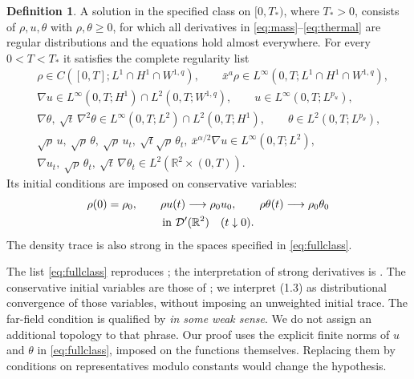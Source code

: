 \documentclass[11pt,letterpaper]{article}
\numberwithin{equation}{section}
\theoremstyle{definition}
\newtheorem{definition}[theorem]{Definition}
\newcommand{\R}{\mathbb R}
\begin{document}
\begin{definition}\label{def:solution}
A solution in the specified class on $[0,T_*)$, where $T_*>0$, consists
of $\rho,u,\theta$ with $\rho,\theta\ge0$, for which all derivatives
in \eqref{eq:mass}--\eqref{eq:thermal} are regular distributions and
the equations hold almost everywhere. For every $0<T<T_*$ it satisfies
the complete regularity list
\begin{equation}
 \begin{aligned}
 &\rho\in C([0,T];L^1\cap H^1\cap W^{1,q}),\qquad
   \bar x^a\rho\in L^\infty(0,T;L^1\cap H^1\cap W^{1,q}),\\
 &\nabla u\in L^\infty(0,T;H^1)\cap L^2(0,T;W^{1,q}),
   \qquad u\in L^\infty(0,T;L^{p_u}),\\
 &\nabla\theta,\ \sqrt t\,\nabla^2\theta
     \in L^\infty(0,T;L^2)\cap L^2(0,T;H^1),
   \qquad\theta\in L^2(0,T;L^{p_\theta}),\\
 &\sqrt\rho\,u,\ \sqrt\rho\,\theta,\ \sqrt\rho\,u_t,\
    \sqrt t\sqrt\rho\,\theta_t,\
    \bar x^{\alpha/2}\nabla u\in L^\infty(0,T;L^2),\\
 &\nabla u_t,\ \sqrt\rho\,\theta_t,\
     \sqrt t\,\nabla\theta_t\in L^2(\R^2\times(0,T)).
 \end{aligned}\label{eq:fullclass}
\end{equation}
Its initial conditions are imposed on conservative variables:
\begin{equation}
 \begin{gathered}
 \rho(0)=\rho_0,\qquad
 \rho u(t)\longrightarrow\rho_0u_0,\qquad
 \rho\theta(t)\longrightarrow\rho_0\theta_0\\
 \hbox{in }\mathcal D'(\R^2)\quad(t\downarrow0).
 \end{gathered}
 \label{eq:traces}
\end{equation}
The density trace is also strong in the spaces specified in
\eqref{eq:fullclass}.
\end{definition}

The list \eqref{eq:fullclass} reproduces \cite[(1.7)]{WangV3};
the interpretation of strong derivatives is
\cite[Definition 1.1]{WangV3}. The conservative initial variables
are those of \cite[(1.3)]{WangV3}; we interpret (1.3) as distributional
convergence of those variables, without imposing an unweighted initial trace.
The far-field condition
\cite[(1.4)]{WangV3} is qualified by \emph{in some weak sense}.
We do not assign an additional topology to that phrase. Our proof
uses the explicit finite norms of $u$ and $\theta$ in
\eqref{eq:fullclass}, imposed on the functions themselves.
Replacing them by conditions on representatives modulo constants
would change the hypothesis.
\end{document}
